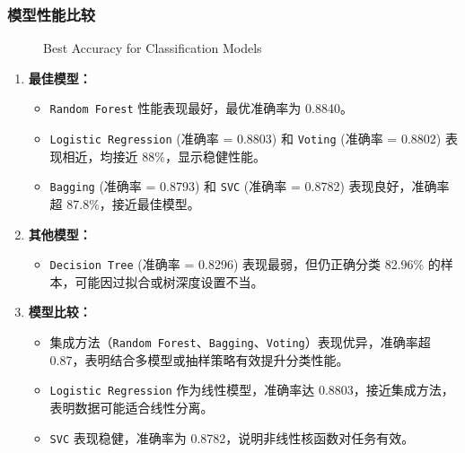 \documentclass[12pt, a4paper, oneside]{ctexart}
\begin{document}
\subsubsection{模型性能比较}
\begin{figure}[h]
    \centering
    \caption{Best Accuracy for Classification Models}
    \label{fig:classification}
\end{figure}

\begin{enumerate}
    \item \textbf{最佳模型：}
    \begin{itemize}
        \item \texttt{Random Forest} 性能表现最好，最优准确率为 0.8840。
        \item \texttt{Logistic Regression} (准确率 = 0.8803) 和 \texttt{Voting} (准确率 = 0.8802) 表现相近，均接近 88\%，显示稳健性能。
        \item \texttt{Bagging} (准确率 = 0.8793) 和 \texttt{SVC} (准确率 = 0.8782) 表现良好，准确率超 87.8\%，接近最佳模型。
    \end{itemize}
    \item \textbf{其他模型：}
    \begin{itemize}
        \item \texttt{Decision Tree} (准确率 = 0.8296) 表现最弱，但仍正确分类 82.96\% 的样本，可能因过拟合或树深度设置不当。
    \end{itemize}
    \item \textbf{模型比较：}
    \begin{itemize}
        \item 集成方法（\texttt{Random Forest}、\texttt{Bagging}、\texttt{Voting}）表现优异，准确率超 0.87，表明结合多模型或抽样策略有效提升分类性能。
        \item \texttt{Logistic Regression} 作为线性模型，准确率达 0.8803，接近集成方法，表明数据可能适合线性分离。
        \item \texttt{SVC} 表现稳健，准确率为 0.8782，说明非线性核函数对任务有效。
    \end{itemize}
\end{enumerate}
\end{document}

